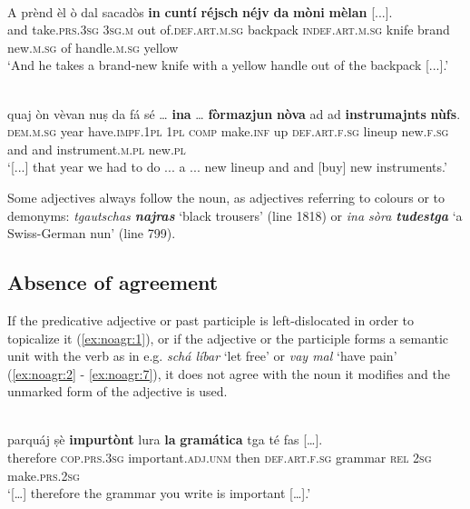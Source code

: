 \ea
\label{ex:cuntirejschnejv}
\\
\gll A prènd èl ò dal sacadòs \textbf{in} \textbf{cuntí} \textbf{réjsch} \textbf{néjv} \textbf{da} \textbf{mòni} \textbf{mèlan} [...].\\
and take.\textsc{prs.3sg} \textsc{3sg.m} out of.\textsc{def.art.m.sg} backpack \textsc{indef.art.m.sg} knife brand new.\textsc{m.sg} of handle.\textsc{m.sg} yellow\\
\glt `And he takes a brand-new knife with a yellow handle out of the backpack [...].'
\z

\ea
\label{ex:formazjun}
\\
\gll  [...] quaj òn vèvan nuṣ da fá sé … \textbf{ina} … \textbf{fòrmazjun} \textbf{nòva} ad ad \textbf{instrumajnts} \textbf{nùfs}.\\
{} \textsc{dem.m.sg} year have.\textsc{impf.1pl} \textsc{1pl} \textsc{comp} make.\textsc{inf} up {} \textsc{def.art.f.sg} {} lineup  new.\textsc{f.sg} and and instrument.\textsc{m.pl} new.\textsc{pl}\\
\glt `[...] that year we had to do ... a ... new lineup and and [buy] new instruments.'
\z

Some adjectives always follow the noun, as adjectives referring to colours or to demonyms: \textit{tgautschas \textbf{najras}} `black trousers' (line 1818) or \textit{ina sòra \textbf{tudestga}} `a Swiss-German nun' (line 799).

\subsection{Absence of agreement}
If the predicative adjective or past participle is left-dislocated in order to topicalize it (\ref{ex:noagr:1}), or if the adjective or the participle forms a semantic unit with the verb as in e.g. \textit{schá líbar} `let free' or \textit{vay mal} `have pain' (\ref{ex:noagr:2} - \ref{ex:noagr:7}), it does not agree with the noun it modifies and the unmarked form of the adjective is used.

\ea\label{ex:noagr:1}
\\
\gll   [...] parquáj ṣè \textbf{impurtònt} lura \textbf{la} \textbf{gramática} tga té fas […]. \\
     {} therefore \textsc{cop.prs.3sg} important.\textsc{adj.unm} then \textsc{def.art.f.sg} grammar \textsc{rel} \textsc{2sg} make.\textsc{prs.2sg}\\
\glt `[…] therefore the grammar you write is important […].'
\z

